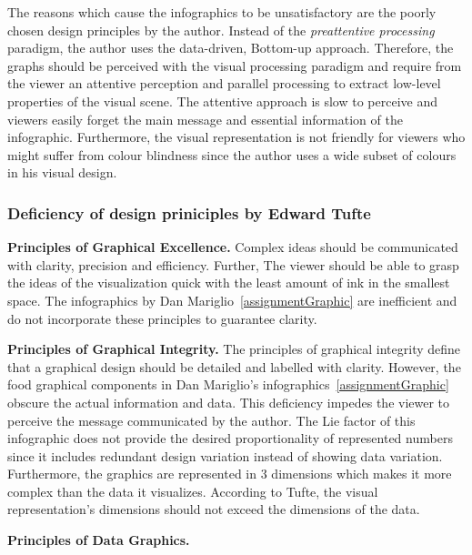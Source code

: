 The reasons which cause the infographics to be unsatisfactory are the poorly
chosen design principles by the author. Instead of the \textit{preattentive
processing} paradigm, the author uses the data-driven, Bottom-up approach.
Therefore, the graphs should be perceived with the visual processing paradigm
and require from the viewer an attentive perception and parallel processing to
extract low-level properties of the visual scene. The attentive approach is slow
to perceive and viewers easily forget the main message and essential information
of the infographic. Furthermore, the visual representation is not friendly for
viewers who might suffer from colour blindness since the author uses a wide
subset of colours in his visual design.

\subsubsection{Deficiency of design priniciples by Edward Tufte}

\textbf{Principles of Graphical Excellence.} Complex ideas should be
communicated with clarity, precision and efficiency. Further, The viewer should
be able to grasp the ideas of the visualization quick with the least amount of
ink in the smallest space. The infographics by Dan
Mariglio~\ref{assignmentGraphic} are inefficient and do not incorporate these
principles to guarantee clarity.

\textbf{Principles of Graphical Integrity.} The principles of graphical
integrity define that a graphical design should be detailed and labelled with
clarity. However, the food graphical components in Dan Mariglio's
infographics~\ref{assignmentGraphic} obscure the actual information and data.
This deficiency impedes the viewer to perceive the message communicated by the
author. The Lie factor of this infographic does not provide the desired
proportionality of represented numbers since it includes redundant design
variation instead of showing data variation. Furthermore, the graphics are
represented in 3 dimensions which makes it more complex than the data it
visualizes. According to Tufte, the visual representation's dimensions should
not exceed the dimensions of the data. 

\textbf{Principles of Data Graphics.}


